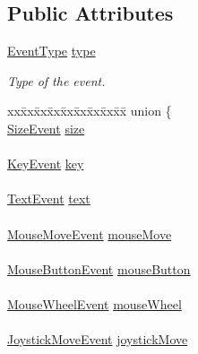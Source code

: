 \subsection*{Public Attributes}
\begin{DoxyCompactItemize}
\item 
\hyperlink{classsf_1_1_event_af41fa9ed45c02449030699f671331d4a}{Event\-Type} \hyperlink{classsf_1_1_event_adf2f8044f713fd9d6019077b0d1ffe0a}{type}
\begin{DoxyCompactList}\small\item\em Type of the event. \end{DoxyCompactList}\item 
\begin{tabbing}
xx\=xx\=xx\=xx\=xx\=xx\=xx\=xx\=xx\=\kill
union \{\\
\>\hyperlink{structsf_1_1_event_1_1_size_event}{SizeEvent} \hyperlink{classsf_1_1_event_a85dae56a377eeffd39183c3f6fc96cb9}{size}\\
\>\\
\>\hyperlink{structsf_1_1_event_1_1_key_event}{KeyEvent} \hyperlink{classsf_1_1_event_a45b92fc6757ca7c193f06b302e424ab0}{key}\\
\>\\
\>\hyperlink{structsf_1_1_event_1_1_text_event}{TextEvent} \hyperlink{classsf_1_1_event_a00c7bba6bee892791847ec22440e0a83}{text}\\
\>\\
\>\hyperlink{structsf_1_1_event_1_1_mouse_move_event}{MouseMoveEvent} \hyperlink{classsf_1_1_event_a786620ec4315d40c7c4cf4ddf3a1881f}{mouseMove}\\
\>\\
\>\hyperlink{structsf_1_1_event_1_1_mouse_button_event}{MouseButtonEvent} \hyperlink{classsf_1_1_event_a20886a16ab7624de070b97145bb1dcac}{mouseButton}\\
\>\\
\>\hyperlink{structsf_1_1_event_1_1_mouse_wheel_event}{MouseWheelEvent} \hyperlink{classsf_1_1_event_a8758c6d7998757978fd9146099a02a1e}{mouseWheel}\\
\>\\
\>\hyperlink{structsf_1_1_event_1_1_joystick_move_event}{JoystickMoveEvent} \hyperlink{classsf_1_1_event_ac479e8351cc2024d5c1094dc33970f7f}{joystickMove}\\

\end{tabbing}
\end{DoxyCompactItemize}
